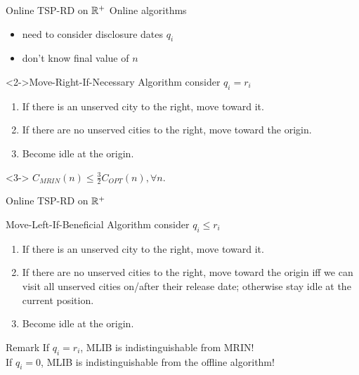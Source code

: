 \begin{frame}{Online TSP-RD on $\Bbb{R}^+$}
  Online algorithms
  \begin{itemize}
    \item need to consider disclosure dates $q_i$
    \item don't know final value of $n$
  \end{itemize}
  \vspace{5pt}

  \begin{block}<2->{Move-Right-If-Necessary Algorithm}
    consider $q_i=r_i$
    \begin{enumerate}
      \item If there is an unserved city to the right, move toward it.
      \item If there are no unserved cities to the right, move toward the origin.
      \item Become idle at the origin.
    \end{enumerate}
  \end{block}

  \begin{Theorem}<3->
    $C_{MRIN}(n) \le \frac {3}{2} C_{OPT}(n), \forall n$.
  \end{Theorem}

\end{frame}

\begin{frame}{Online TSP-RD on $\Bbb{R}^+$}

  \begin{block}{Move-Left-If-Beneficial Algorithm}
    consider $q_i \le r_i$
    \begin{enumerate}
      \item If there is an unserved city to the right, move toward it.
      \item If there are no unserved cities to the right, move toward the origin \alert{iff} we can visit all unserved cities on/after their release date; otherwise stay idle at the current position.
      \item Become idle at the origin.
    \end{enumerate}
  \end{block}

  \begin{block}{Remark}
    If $q_i = r_i$, MLIB is indistinguishable from MRIN!\\
    If $q_i = 0$, MLIB is indistinguishable from the offline algorithm!
  \end{block}

\end{frame}

